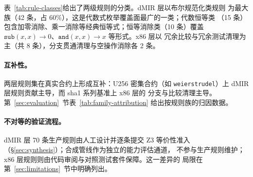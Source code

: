 

表~\ref{tab:rule-classes}给出了两级规则的分类。dMIR 层以布尔规范化类规则
为最大族（42 条，占 60\%），这是代数式枚举覆盖面最广的一类；代数恒等类
（15 条）包含加零消除、乘一消除等经典恒等式；恒等消除类（10 条）覆盖
$\texttt{sub}(x,x) \to 0$、$\texttt{and}(x,x) \to x$ 等形式。x86 层以
冗余比较与冗余测试清理为主（共 8 条），分支贯通清理与空操作消除各 2 条。

\paragraph{互补性。}两层规则集在真实合约上形成互补：U256 密集合约（如
\texttt{weierstrudel}）上 dMIR 层规则贡献主导，而 sha1 系列基准上 x86 层的
分支与比较清理主导。第~\ref{sec:evaluation}~节表~\ref{tab:family-attribution}
给出按规则族的归因数据。

\paragraph{不对等的验证流程。}dMIR 层 70 条生产规则由人工设计并逐条提交
Z3 等价性准入（§\ref{sec:synthesis}）；合成管线作为独立的能力评估通道，
不参与生产规则维护；x86 层规则则由代码审阅与对照测试套件保障。这一差异的
局限在第~\ref{sec:limitations}~节中明确列出。
